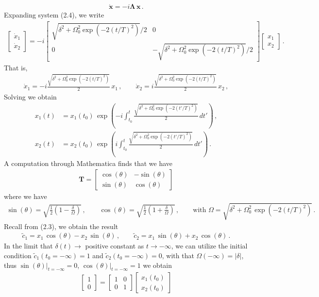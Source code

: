 \documentclass[11pt, oneside]{book}
\theoremstyle{break}
\theoremstyle{break}
\newcommand{\that}[1]{\widetilde{#1}}
\newcommand{\bmat}[1]{\begin{bmatrix} #1 \end{bmatrix}}
\begin{document}
\begin{align}
\dot{\mathbf{x}} = -i \mathbf{\Lambda}\, \mathbf{x}\,.
\end{align}
Expanding system (2.4), we write
\begin{align*}
\bmat{\dot{x}_1\\\dot{x}_2} = -i\bmat{\sqrt{\delta^2 + \Omega_0^2\exp(-2(t/T)^2)}/2 & 0 \\ 0 & -\sqrt{\delta^2 + \Omega_0^2\exp(-2(t/T)^2)}/2} \bmat{x_1 \\ x_2}\,.
\end{align*}
That is, 
\begin{align*}
\dot{x}_1 = -i\frac{\sqrt{\delta^2 + \Omega_0^2\exp(-2(t/T)^2)}}{2}\, x_1\,,\qquad
\dot{x}_2 = i\frac{\sqrt{\delta^2 + \Omega_0^2\exp(-2(t/T)^2)}}{2}\, x_2\,,
\end{align*}
Solving we obtain
\begin{align}
x_1(t) &=x_1(t_0)\, \exp\left(-i \int_{t_0}^t \frac{\sqrt{\delta^2 + \Omega_0^2\exp(-2(t'/T)^2)}}{2}\, dt'\right)\,,\\
x_2(t) &=x_2(t_0)\, \exp\left(i \int_{t_0}^t \frac{\sqrt{\delta^2 + \Omega_0^2\exp(-2(t'/T)^2)}}{2}\, dt'\right)\,.
\end{align}
A computation through Mathematica finds that we have
\begin{align*}
\mathbf{T} = 
\bmat{
\cos(\theta) & -\sin(\theta)\\
\sin(\theta) & \cos(\theta)
}
\end{align*}
where we have
\begin{align*}
\sin(\theta)  = \sqrt{\frac{1}{2}\left( 1- \frac{\delta}{\Omega}\right)} \,,\qquad
\cos(\theta) = \sqrt{\frac{1}{2}\left( 1 + \frac{\delta}{\Omega}\right)}\,,\qquad
\text{with }\Omega = \sqrt{\delta^2 + \Omega_0^2\,\exp(-2(t/T)^2)}\,.
\end{align*}
Recall from (2.3), we obtain the result
\begin{align*}
\that{c}_1 = x_1\,\cos(\theta) - x_2 \, \sin(\theta)\,,\qquad
\that{c}_2 = x_1\,\sin(\theta) + x_2 \, \cos(\theta)\,.
\end{align*}
In the limit that $\delta(t) \to $ positive constant as $t \to -\infty$, we can utilize the initial condition $\that{c}_1(t_0=-\infty)=1$ and $\that{c}_2(t_0=-\infty)=0$, with that $\Omega(-\infty) = |\delta|$, thus $\sin(\theta)|_{t=-\infty} = 0$, $\cos(\theta)|_{t=-\infty} = 1$
we obtain
\begin{align*}
\bmat{1 \\ 0} = \bmat{
1 & 0 \\ 0 & 1
}\bmat{x_1(t_0)\\ x_2(t_0)}
\end{align*}
\end{document}
